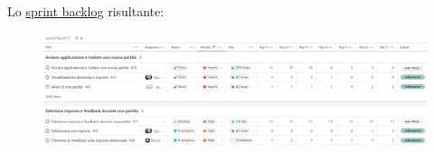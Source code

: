 
Lo \href{https://github.com/orgs/ISIQuiz/projects/3/}{sprint backlog} risultante:

\begin{figure}[H]
    \centering
    \includegraphics[width=\textwidth]{process/Img/Sprint5BL.jpg}
    \label{fig:Sprint5BL}
\end{figure}